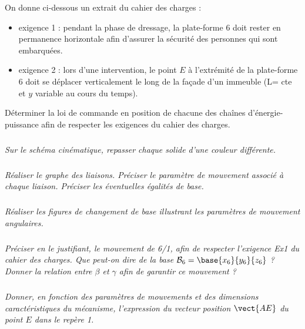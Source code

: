 On donne ci-dessous un extrait du cahier des charges : 
\begin{itemize}
\item exigence 1 : pendant la phase de dressage, la plate-forme 6 doit rester en permanence horizontale afin d’assurer la
sécurité des personnes qui sont embarquées. 
\item exigence 2 : lors d’une intervention, le point $E$ à l’extrémité de la plate-forme 6 doit se déplacer verticalement le long de la façade d’un immeuble (L= cte et $y$ variable au cours du temps).
\end{itemize}

\begin{obj}
Déterminer la loi de commande en position de chacune des chaînes d’énergie-puissance afin de
respecter les exigences du cahier des charges.
\end{obj}

\subparagraph{}
\textit{Sur le schéma cinématique, repasser chaque solide d’une couleur différente.}
\ifprof
\begin{corrige}
\end{corrige}
\else
\fi

\subparagraph{}
\textit{Réaliser le graphe des liaisons. Préciser le paramètre de mouvement associé à chaque liaison. Préciser les
éventuelles égalités de base.}
\ifprof
\begin{corrige}
\end{corrige}
\else
\fi

\subparagraph{}
\textit{Réaliser les figures de changement de base illustrant les paramètres de mouvement angulaires.}
\ifprof
\begin{corrige}
\end{corrige}
\else
\fi

\subparagraph{}
\textit{Préciser en le justifiant, le mouvement de 6/1, afin de respecter l’exigence Ex1 du cahier des charges. Que peut-on dire de la base $\mathcal{B}_6 = \base{x_6}{y_6}{z_6}$ ? Donner la relation entre $\beta$ et $\gamma$ afin de garantir ce mouvement ?}
\ifprof
\begin{corrige}
\end{corrige}
\else
\fi

\subparagraph{}
\textit{ Donner, en fonction des paramètres de mouvements et des dimensions caractéristiques du mécanisme,
l’expression du vecteur position $\vect{AE}$ du point $E$ dans le repère 1.}
\ifprof
\begin{corrige}
\end{corrige}
\else
\fi

